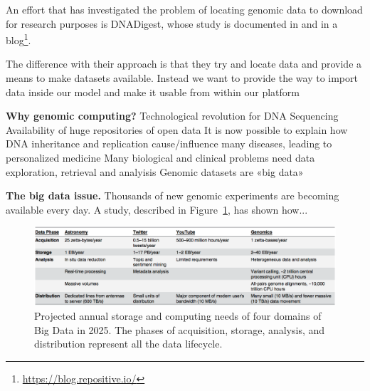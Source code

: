 \documentclass[journal]{IEEEtran}
\begin{document}

An effort that has investigated the problem of locating genomic data to download for research purposes is DNADigest, whose study is documented in \cite{kovalevskaya2016dnadigest} and in a blog\footnote{\url{https://blog.repositive.io/}}.

The difference with their approach is that they try and locate data and provide a means to make datasets available. Instead we want to provide the way to import data inside our model and make it usable from within our platform

\textbf{Why genomic computing?}
Technological revolution for DNA Sequencing
Availability of huge repositories of open data
It is now possible to explain how DNA inheritance and replication cause/influence many diseases, leading to personalized medicine
Many biological and clinical problems need data exploration, retrieval and analyisis
Genomic datasets are «big data»

\textbf{The big data issue.}
Thousands of new genomic experiments are becoming available every day. A study, described in Figure~\ref{fig:astrogeno}, has shown how...

\begin{figure}
  \includegraphics[width=\textwidth]{astrogeno}
  \caption{Projected annual storage and computing needs of four domains of Big Data in 2025. The phases of acquisition, storage, analysis, and distribution represent all the data lifecycle.}
  \label{fig:astrogeno}
\end{figure}
\end{document}
